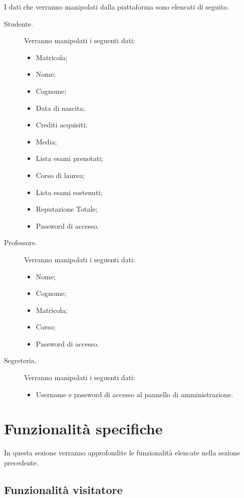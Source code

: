 \documentclass [a4paper,11pt]{book}
\begin{document}
I dati che verranno manipolati dalla piattaforma sono elencati di seguito.
\begin{description}
\item[Studente.] Verranno manipolati i seguenti dati:

\begin{itemize}
\item Matricola;
\item Nome;
\item Cognome;
\item Data di nascita;
\item Crediti acquisiti;
\item Media;
\item Lista esami prenotati; 
\item Corso di laurea;
\item Lista esami sostenuti;
\item Reputazione Totale;
\item Password di accesso.
\end{itemize}

\item[Professore.] Verranno manipolati i seguenti dati:

\begin{itemize}
\item Nome;
\item Cognome;
\item Matricola;
\item Corso;
\item Password di accesso.
\end{itemize}

\item[Segreteria.] Verranno manipolati i seguenti dati:
\begin{itemize}
\item Username e password di accesso al pannello di amministrazione.
\end{itemize}
\end{description}

\medskip
\medskip

\section{Funzionalità specifiche}

In questa sezione verranno approfondite le funzionalità elencate nella sezione precedente.

\subsection{Funzionalità visitatore}
\end{document}
